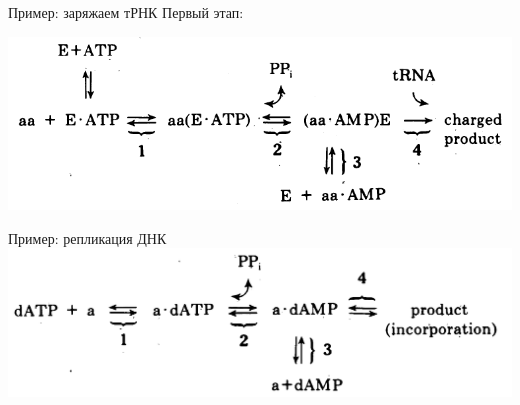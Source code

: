 \documentclass{beamer}
\begin{document}
\begin{frame}{Пример: заряжаем тРНК}
Первый этап:

\centering \includegraphics[width=.7\textwidth]{reaction_trna}

\end{frame}

\begin{frame}{Пример: репликация ДНК}
    \centering \includegraphics[width=.7\textwidth]{reaction_dna}

\end{frame}
\end{document}
